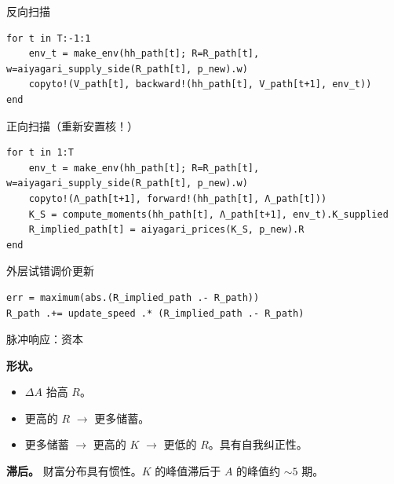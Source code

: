 \documentclass[10pt,aspectratio=169]{beamer}
\begin{document}
\begin{frame}[fragile]{反向扫描}
\begin{lstlisting}
for t in T:-1:1
    env_t = make_env(hh_path[t]; R=R_path[t], w=aiyagari_supply_side(R_path[t], p_new).w)
    copyto!(V_path[t], backward!(hh_path[t], V_path[t+1], env_t))
end
\end{lstlisting}

\end{frame}

\begin{frame}[fragile]{正向扫描（重新安置核！）}
\begin{lstlisting}
for t in 1:T
    env_t = make_env(hh_path[t]; R=R_path[t], w=aiyagari_supply_side(R_path[t], p_new).w)
    copyto!(Λ_path[t+1], forward!(hh_path[t], Λ_path[t]))
    K_S = compute_moments(hh_path[t], Λ_path[t+1], env_t).K_supplied
    R_implied_path[t] = aiyagari_prices(K_S, p_new).R
end
\end{lstlisting}

\end{frame}

\begin{frame}[fragile]{外层试错调价更新}
\begin{lstlisting}
err = maximum(abs.(R_implied_path .- R_path))
R_path .+= update_speed .* (R_implied_path .- R_path)
\end{lstlisting}

\end{frame}


\begin{frame}{脉冲响应：资本}

\textbf{形状。}

\begin{itemize}
  \item $\Delta A$ 抬高 $R$。
  \item 更高的 $R$ $\to$ 更多储蓄。
  \item 更多储蓄 $\to$ 更高的 $K$ $\to$ 更低的 $R$。具有自我纠正性。
\end{itemize}

\vspace{0.4em}

\textbf{滞后。} 财富分布具有惯性。$K$ 的峰值滞后于 $A$ 的峰值约 $\sim 5$ 期。

\end{frame}
\end{document}
